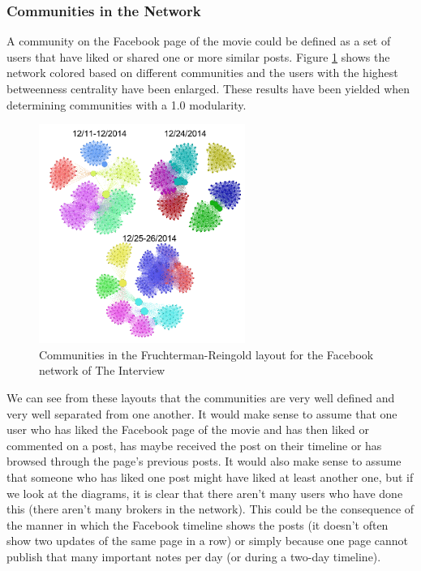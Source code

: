 \documentclass{llncs}
\begin{document}
\subsubsection{Communities in the Network}
A community on the Facebook page of the movie could be defined as a set of users
that have liked or shared one or more similar posts. Figure
\ref{fig:interview-facebook-communities} shows the
network colored based on different communities and the users with the highest
betweenness centrality have been enlarged. These results have been yielded when
determining communities with a 1.0 modularity.
%
\begin{figure}
\centering
\includegraphics[width=0.6\textwidth]{interview-facebook-communities.png}
\caption{Communities in the Fruchterman-Reingold layout for the Facebook network
    of The Interview
\label{fig:interview-facebook-communities}}
\end{figure}
%
We can see from these layouts that the communities are very well defined and
very well separated from one another. It would make sense to assume that one
user who has liked the Facebook page of the movie and has then liked or
commented on a post, has maybe received the post on their timeline or has
browsed through the page's previous posts. It would also make sense to assume
that someone who has liked one post might have liked at least another one, but
if we look at the diagrams, it is clear that there aren't many users who have
done this (there aren't many brokers in the network). This could be the
consequence of the manner in which the Facebook timeline shows the posts (it
doesn't often show two updates of the same page in a row) or simply because one
page cannot publish that many important notes per day (or during a two-day
timeline).
%
\end{document}
